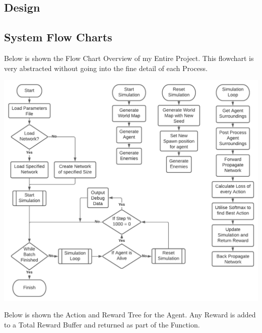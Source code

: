 \begin{flushleft}
    \Large
    \section{Design}
        \subsection{System Flow Charts}
            \large
            \vspace{0.2cm}
            Below is shown the Flow Chart Overview of my Entire Project. This flowchart is very abstracted without going into
            the fine detail of each Process. \\
            
            \vspace{0.5cm}
            \centerline{\includegraphics[width=\textwidth]{Images/Design/NEAFlowChart.png}}
            \vspace{0.5cm}

            Below is shown the Action and Reward Tree for the Agent. Any Reward is added to a Total Reward Buffer and returned
            as part of the Function. \\


\end{flushleft}
